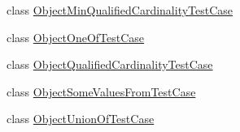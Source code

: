 \begin{DoxyCompactItemize}
\item 
class \hyperlink{classorg_1_1semanticweb_1_1owlapi_1_1api_1_1test_1_1classexpressions_1_1_object_min_qualified_cardinality_test_case}{Object\-Min\-Qualified\-Cardinality\-Test\-Case}
\item 
class \hyperlink{classorg_1_1semanticweb_1_1owlapi_1_1api_1_1test_1_1classexpressions_1_1_object_one_of_test_case}{Object\-One\-Of\-Test\-Case}
\item 
class \hyperlink{classorg_1_1semanticweb_1_1owlapi_1_1api_1_1test_1_1classexpressions_1_1_object_qualified_cardinality_test_case}{Object\-Qualified\-Cardinality\-Test\-Case}
\item 
class \hyperlink{classorg_1_1semanticweb_1_1owlapi_1_1api_1_1test_1_1classexpressions_1_1_object_some_values_from_test_case}{Object\-Some\-Values\-From\-Test\-Case}
\item 
class \hyperlink{classorg_1_1semanticweb_1_1owlapi_1_1api_1_1test_1_1classexpressions_1_1_object_union_of_test_case}{Object\-Union\-Of\-Test\-Case}
\end{DoxyCompactItemize}
